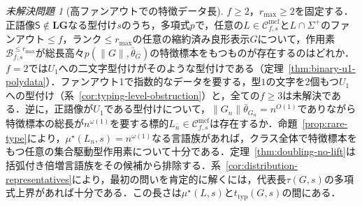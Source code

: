 \documentclass[11pt,a4paper]{ltjsarticle}
\numberwithin{equation}{section}
\theoremstyle{plain}
\theoremstyle{definition}
\theoremstyle{remark}
\newtheorem{openproblem}[theorem]{未解決問題}
\newcommand{\Cmcf}[2]{\mathcal{C}^{\mathrm{mcf}}_{#1,#2}}
\begin{document}
\begin{openproblem}[高ファンアウトでの特徴データ長]
\label{op:fanout-two}
$f\ge2$，$r_{\max}\ge2$を固定する．正語像$\mathsf S\notin\mathbf{LG}$なる型付け$s$のうち，多項式$p$で，任意の$L\in\Cmcf{f}{s}$と$L\cap\Sigma^+$のファンアウト$\le f$，ランク$\le r_{\max}$の任意の縮約済み良形表示$G$について，作用素$\mathcal B^{\le r_{\max}}_{f,s}$が総長高々$p(\|G\|,\bar\theta_G)$の特徴標本をもつものが存在するのはどれか．$f=2$では$U_1$への二文字型付けがそのような型付けである（定理~\ref{thm:binary-u1-polydata}）．ファンアウト1で指数的なデータを要する，型$1$の文字を2個もつ$U_1$への型付け（系~\ref{cor:typing-level-obstruction}）と，全ての$f\ge3$は未解決である．逆に，正語像が$U_1$である型付けについて，$\|G_n\|\bar\theta_{G_n}=n^{O(1)}$でありながら特徴標本の総長が$n^{\omega(1)}$を要する標的$L_n\in\Cmcf{f}{s}$は存在するか．命題~\ref{prop:rare-type}により，$\mu^\star(L_n,s)=n^{\omega(1)}$なる言語族があれば，クラス全体で特徴標本をもつ任意の集合駆動型作用素について十分である．定理~\ref{thm:doubling-no-lift}は括弧付き倍増言語族をその候補から排除する．系~\ref{cor:distribution-representatives}により，最初の問いを肯定的に解くには，代表長$\tau(G,s)$の多項式上界があれば十分である．この長さは$\mu^\star(L,s)$と$t_{\mathrm{typ}}(G,s)$の間にある．
\end{openproblem}
\end{document}
